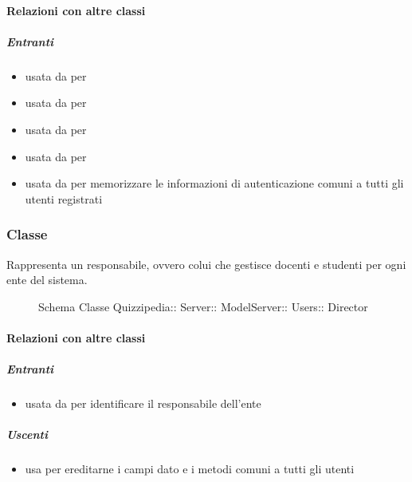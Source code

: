 \paragraph{Relazioni con altre classi}
\subparagraph{Entranti}
\begin{itemize}
\item usata da  per 
\item usata da  per 
\item usata da  per 
\item usata da  per 
\item usata da  per memorizzare le informazioni di autenticazione comuni a tutti gli utenti registrati
\end{itemize}
\subsubsection{Classe }
Rappresenta un responsabile, ovvero colui che gestisce docenti e studenti per ogni ente del sistema.
\begin{figure}[H]
\centering
\noindent{}
\caption[Schema Classe Director]{Schema Classe Quizzipedia:: Server:: ModelServer:: Users:: Director}
\end{figure}
\paragraph{Relazioni con altre classi}
\subparagraph{Entranti}
\begin{itemize}
\item usata da  per identificare il responsabile dell'ente
\end{itemize}
\subparagraph{Uscenti}
\begin{itemize}
\item usa  per ereditarne i campi dato e i metodi comuni a tutti gli utenti
\end{itemize}
